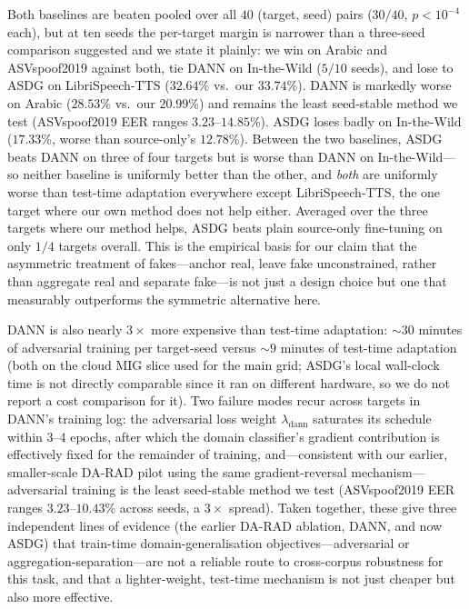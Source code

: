 \documentclass[conference]{IEEEtran}
\begin{document}
Both baselines are beaten pooled over all $40$ (target, seed) pairs ($30/40$,
$p\!<\!10^{-4}$ each), but at ten seeds the per-target margin is narrower than a
three-seed comparison suggested and we state it plainly: we win on Arabic and
ASVspoof2019 against both, tie DANN on In-the-Wild ($5/10$ seeds), and lose to
ASDG on LibriSpeech-TTS ($32.64\%$ vs.\ our $33.74\%$). DANN is markedly worse
on Arabic ($28.53\%$ vs.\ our $20.99\%$) and remains the least seed-stable
method we test (ASVspoof2019 EER ranges $3.23$--$14.85\%$). ASDG loses badly on
In-the-Wild ($17.33\%$, worse than source-only's $12.78\%$). Between the two
baselines, ASDG beats DANN on three of four targets but is worse than DANN on
In-the-Wild---so neither baseline is uniformly better than the other, and
\emph{both} are
uniformly worse than test-time adaptation everywhere except LibriSpeech-TTS,
the one target where our own method does not help either. Averaged over the
three targets where our method helps, ASDG beats plain source-only fine-tuning
on only $1/4$ targets overall. This is the empirical basis for our claim that
the asymmetric treatment of fakes---anchor real, leave fake unconstrained,
rather than aggregate real and separate
fake---is not just a design choice but one that measurably outperforms the
symmetric alternative here.

DANN is also nearly $3\times$ more expensive than test-time adaptation:
$\sim\!30$ minutes of adversarial training per target-seed versus $\sim\!9$
minutes of test-time adaptation (both on the cloud MIG slice used for the main
grid; ASDG's local wall-clock time is not directly comparable since it ran on
different hardware, so we do not report a cost comparison for it). Two failure
modes recur across targets in DANN's training log: the adversarial loss weight
$\lambda_{\mathrm{dann}}$ saturates its schedule within 3--4 epochs, after which
the domain classifier's gradient contribution is effectively fixed for the
remainder of training, and---consistent with our earlier, smaller-scale DA-RAD
pilot using the same gradient-reversal mechanism---adversarial training is the
least seed-stable method we test (ASVspoof2019 EER ranges $3.23$--$10.43\%$
across seeds, a $3\times$ spread). Taken together, these give three independent
lines of evidence (the earlier DA-RAD ablation, DANN, and now ASDG) that
train-time domain-generalisation objectives---adversarial or
aggregation-separation---are not a reliable route to cross-corpus robustness
for this task, and that a lighter-weight, test-time mechanism is not just
cheaper but also more effective.
\end{document}
